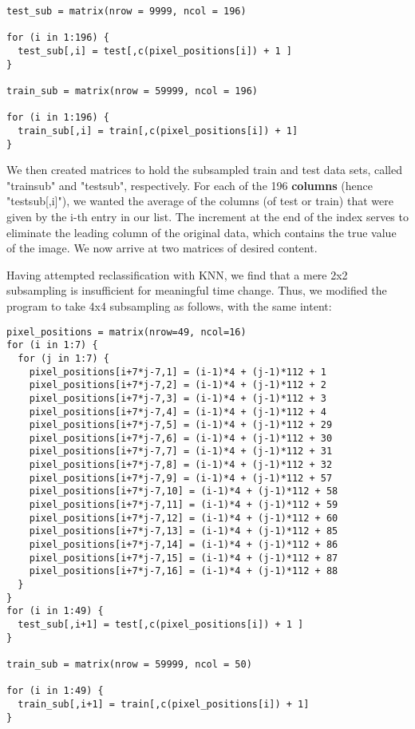 \documentclass[10pt]{extarticle}
\begin{document}
\begin{verbatim}
test_sub = matrix(nrow = 9999, ncol = 196)

for (i in 1:196) {
  test_sub[,i] = test[,c(pixel_positions[i]) + 1 ]
}

train_sub = matrix(nrow = 59999, ncol = 196)

for (i in 1:196) {
  train_sub[,i] = train[,c(pixel_positions[i]) + 1]
}
\end{verbatim}

We then created matrices to hold the subsampled train and test data sets, called "train\textunderscore sub" and "test\textunderscore sub", respectively. For each of the 196 \textbf{columns} (hence "test\textunderscore sub[,i]"), we wanted the average of the columns (of test or train) that were given by the i-th entry in our list. The increment at the end of the index serves to eliminate the leading column of the original data, which contains the true value of the image. We now arrive at two matrices of desired content. 

Having attempted reclassification with KNN, we find that a mere 2x2 subsampling is insufficient for meaningful time change. Thus, we modified the program to take 4x4 subsampling as follows, with the same intent: 

\begin{verbatim}
pixel_positions = matrix(nrow=49, ncol=16)
for (i in 1:7) {
  for (j in 1:7) {
    pixel_positions[i+7*j-7,1] = (i-1)*4 + (j-1)*112 + 1
    pixel_positions[i+7*j-7,2] = (i-1)*4 + (j-1)*112 + 2
    pixel_positions[i+7*j-7,3] = (i-1)*4 + (j-1)*112 + 3
    pixel_positions[i+7*j-7,4] = (i-1)*4 + (j-1)*112 + 4
    pixel_positions[i+7*j-7,5] = (i-1)*4 + (j-1)*112 + 29
    pixel_positions[i+7*j-7,6] = (i-1)*4 + (j-1)*112 + 30
    pixel_positions[i+7*j-7,7] = (i-1)*4 + (j-1)*112 + 31
    pixel_positions[i+7*j-7,8] = (i-1)*4 + (j-1)*112 + 32
    pixel_positions[i+7*j-7,9] = (i-1)*4 + (j-1)*112 + 57
    pixel_positions[i+7*j-7,10] = (i-1)*4 + (j-1)*112 + 58
    pixel_positions[i+7*j-7,11] = (i-1)*4 + (j-1)*112 + 59
    pixel_positions[i+7*j-7,12] = (i-1)*4 + (j-1)*112 + 60
    pixel_positions[i+7*j-7,13] = (i-1)*4 + (j-1)*112 + 85
    pixel_positions[i+7*j-7,14] = (i-1)*4 + (j-1)*112 + 86
    pixel_positions[i+7*j-7,15] = (i-1)*4 + (j-1)*112 + 87
    pixel_positions[i+7*j-7,16] = (i-1)*4 + (j-1)*112 + 88
  }
}
for (i in 1:49) {
  test_sub[,i+1] = test[,c(pixel_positions[i]) + 1 ]
}

train_sub = matrix(nrow = 59999, ncol = 50)

for (i in 1:49) {
  train_sub[,i+1] = train[,c(pixel_positions[i]) + 1]
}
\end{verbatim}
\end{document}
